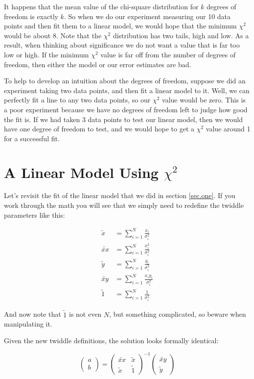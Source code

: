\documentclass[letterpaper,12pt]{article}
\begin{document}
It happens that the mean value of the chi-square distribution for $k$ degrees of freedom is exactly $k$. So when we do our experiment measuring our 10 data points and then fit them to a linear model, we would hope that the minimum $\chi^2$ would be about 8. Note that the $\chi^2$ distribution has two tails, high and low. As a result, when thinking about significance we do not want a value that is far too low or high. If the minimum $\chi^2$ value is far off from the number of degrees of freedom, then either the model or our error estimates are bad.

To help to develop an intuition about the degrees of freedom, suppose we did an experiment taking two data points, and then fit a linear model to it. Well, we can perfectly fit a line to any two data points, so our $\chi^2$ value would be zero. This is a poor experiment because we have no degrees of freedom left to judge how good the fit is. If we had taken 3 data points to test our linear model, then we would have one degree of freedom to test, and we would hope to get a $\chi^2$ value around 1 for a successful fit.

\section{A Linear Model Using $\chi^2$}
Let's revisit the fit of the linear model that we did in section \ref*{sec.one}. If you work through the math you will see that we simply need to redefine the twiddle parameters like this:

\begin{equation}
\begin{aligned}
\label{twiddle2}
\widetilde{x}&=\sum_{i=1}^N \frac{x_i}{\sigma_i^2}\\
\widetilde{xx}&=\sum_{i=1}^N \frac{x_i^2}{\sigma_i^2}\\
\widetilde{y}&=\sum_{i=1}^N \frac{y_i}{\sigma_i^2}\\
\widetilde{xy}&=\sum_{i=1}^N \frac{x_i y_i}{\sigma_i^2}\\
\widetilde{1}&=\sum_{i=1}^N \frac{1}{\sigma_i^2}
\end{aligned}
\end{equation}

And now note that $\widetilde{1}$ is not even $N$, but something complicated, so beware when manipulating it.

Given the new twiddle definitions, the solution looks formally identical:

\begin{equation} \label{eq.linear.solution}
\begin{pmatrix}
a \\
b
\end{pmatrix} =
\begin{pmatrix}
\widetilde{xx} & \widetilde{x} \\
\widetilde{x} & \widetilde{1}
\end{pmatrix} ^{-1}
\begin{pmatrix}
\widetilde{xy}  \\
\widetilde{y}
\end{pmatrix}
\end{equation}
\end{document}
